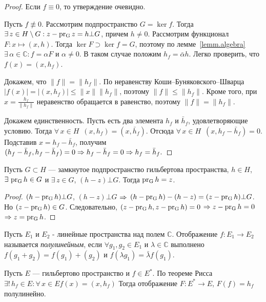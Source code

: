 \documentclass[12pt,titlepage, a4paper]{article}
\begin{document}
\begin{proof}
Если $f\equiv0$, то утверждение очевидно.

Пусть $f\not\equiv 0$. Рассмотрим подпространство $G=\ker f$. Тогда
$\exists\,z\p\in H\setminus G:z-\pr{G}z=h\bot G$, причем $h\neq 0$.
Рассмотрим функционал $F\colon x\mapsto (x,h)$. Тогда $\ker F\supset
\ker f=G$, поэтому по лемме~\ref{lemm.algebra}
$\exists\,\alpha\in\mathbb{C}: f=\alpha F$ и $\alpha\neq 0$. В таком
случае положим $h_f=\bar{\alpha}h$. Легко проверить, что
$f(x)=(x,h_f)$.

Докажем, что $\|f\|=\|h_f\|$. По неравенству
Коши--Буняковского--Шва\-рца
$|f(x)|=|(x,h_f)|\leqslant\|x\|\|h_f\|$, поэтому
$\|f\|\leqslant\|h_f\|$. Кроме того, при $x=\frac{h_f}{\|h_f\|}$
неравенство обращается в равенство, поэтому $\|f\|=\|h_f\|$.

Докажем единственность. Пусть есть два элемента $h_f$ и $\bar{h}_f$,
удовлетворяющие условию. Тогда $\forall\,x\in H$\
$(x,h_f)=(x,\bar{h}_f)$. Отсюда $\forall\,x\in H$\
$(x,h_f-\bar{h}_f)=0$. Подставив $x=h_f-\bar{h}_f$, получим
$(h_f-\bar{h}_f,h_f-\bar{h}_f)=0\p\Rightarrow
h_f-\bar{h}_f=0\Rightarrow h_f=\bar{h}_f.$
\end{proof}

\lecture

\begin{theorem}
Пусть $G\subset H$ --- замкнутое подпространство гильбертова
пространства, $h\in H$, $\exists\, \mathop{\mathrm{pr_{G}}}h\in G $ и $\exists\,z\in
G$, $(h-z)\bot G$. Тогда $\mathop{\mathrm{pr_{G}}}h=z$.
\end{theorem}

\begin{proof}
$(h-\mathop{\mathrm{pr_{G}}}h)\bot G$, $(h-z)\bot G$ $\p\Rightarrow$
$(h-\pr{G}h)-(h-z)=(z\p-\pr{G}h)\bot G$. Но $(z-\mathop{\mathrm{pr_{G}}}h)\in G$.
Следовательно, $(z-\mathop{\mathrm{pr_{G}}}h,z-\mathop{\mathrm{pr_{G}}}h)=0\;$$ \p\Rightarrow
z-\pr{G}h=0\;$$\Rightarrow z=\mathop{\mathrm{pr_{G}}}h$.
\end{proof}

\begin{defen}
Пусть $E_1$ и $E_2$ - линейные пространства над полем $\mathbb{C}$.
Отображение $f:E_1\rightarrow E_2$ называется \emph{полулинейным},
если $\forall g_1, g_2\in E_1$ и $\lambda \in \mathbb{C}$ выполнено
$f(g_1+g_2)=f(g_1)+(g_2)$ и $f(\lambda g_1)=\bar{\lambda} f(g_1)$.
\end{defen}

\begin{zam}
Пусть $E$ --- гильбертово пространство и $f\in E^*$. По теореме
Рисса  $\exists!\,h_f\in E:\forall\,x\in E$\;\;$f(x)=(x,h_f)$ Тогда
отображение $F\colon E^*\rightarrow E$, $F(f)=h_f$ полулинейно.
\end{zam}
\end{document}
